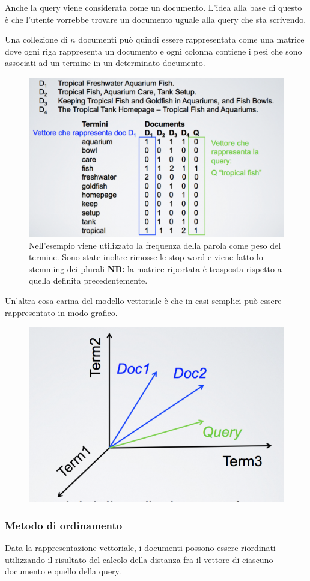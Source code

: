 Anche la query viene considerata come un documento. L'idea alla base di questo è che l'utente vorrebbe trovare un documento uguale alla query che sta scrivendo.

Una collezione di $n$ documenti può quindi essere rappresentata come una matrice dove ogni riga rappresenta un documento e ogni colonna contiene i pesi che sono associati ad un termine in un determinato documento.

\begin{figure}[htbp]
	\centering
	\includegraphics[width=0.5\linewidth]{images/l8-mod-vet}
	\caption{Nell'esempio viene utilizzato la frequenza della parola come peso del termine. Sono state inoltre rimosse le stop-word e viene fatto lo stemming dei plurali \textbf{NB:} la matrice riportata è trasposta rispetto a quella definita precedentemente.}
\end{figure}

\noindent Un'altra cosa carina del modello vettoriale è che in casi semplici può essere rappresentato in modo grafico.

\begin{figure}[htbp]
	\centering
	\includegraphics[width=0.5\linewidth]{images/l8-vet}
\end{figure}

\subsubsection{Metodo di ordinamento}

Data la rappresentazione vettoriale, i documenti possono essere riordinati utilizzando il risultato del calcolo della distanza fra il vettore di ciascuno documento e quello della query.

